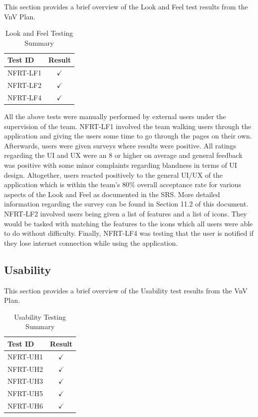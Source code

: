 \documentclass[12pt, titlepage]{article}
\begin{document}
This section provides a brief overview of the Look and Feel test results from the VnV Plan.

\begin{longtable}{|l|c|}
  \caption{Look and Feel Testing Summary} \label{Look and Feel Testing Summary} \\
  \toprule
  \textbf{Test ID} & \textbf{Result} \\
  \midrule
  NFRT-LF1 & $\checkmark$ \\
  \midrule
  NFRT-LF2 & $\checkmark$ \\
  \midrule
  NFRT-LF4 & $\checkmark$ \\
  \bottomrule
\end{longtable}

All the above tests were manually performed by external users under the supervision of the team.
NFRT-LF1 involved the team walking users through the application and giving the users some time
to go through the pages on their own. Afterwards, users were given surveys where results
were positive. All ratings regarding the UI and UX were an 8 or higher on average and general feedback was positive
with some minor complaints regarding blandness in terms of UI design. Altogether, users reacted positively
to the general UI/UX of the application which is within the team's 80\% overall acceptance rate for various aspects
of the Look and Feel as documented in the SRS. More detailed information
regarding the survey can be found in Section 11.2 of this document. NFRT-LF2 involved users being given a list of features
and a list of icons. They would be tasked with matching the features to the icons which all users were
able to do without difficulty. Finally, NFRT-LF4 was testing that the user is notified if they lose internet
connection while using the application.

\subsection{Usability}

This section provides a brief overview of the Usability test results from the VnV Plan.

\begin{longtable}{|l|c|}
  \caption{Usability Testing Summary} \label{Usability Testing Summary} \\
  \toprule
  \textbf{Test ID} & \textbf{Result} \\
  \midrule
  NFRT-UH1 & $\checkmark$ \\
  \midrule
  NFRT-UH2 & $\checkmark$ \\
  \midrule
  NFRT-UH3 & $\checkmark$ \\
  \midrule
  NFRT-UH5 & $\checkmark$ \\
  \midrule
  NFRT-UH6 & $\checkmark$ \\
  \bottomrule
\end{longtable}
\end{document}
